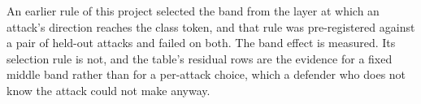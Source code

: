 \documentclass[../main.tex]{subfiles}
\begin{document}
An earlier rule of this project selected the band from the layer at which an attack's direction reaches the class token, and that rule was pre-registered against a pair of held-out attacks and failed on both. The band effect is measured. Its selection rule is not, and the table's residual rows are the evidence for a fixed middle band rather than for a per-attack choice, which a defender who does not know the attack could not make anyway.
\end{document}
